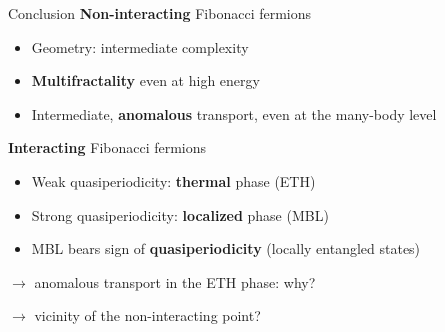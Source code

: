 \begin{frame}{Conclusion}
\textbf{Non-interacting} Fibonacci fermions
\begin{itemize}
	\item Geometry: intermediate complexity
	\item \textbf{Multifractality} even at high energy
	\item Intermediate, \textbf{anomalous} transport, even at the many-body level
\end{itemize}
\textbf{Interacting} Fibonacci fermions
\begin{itemize}
	\item Weak quasiperiodicity: \textcolor{comp}{\textbf{thermal} phase (ETH)}
	\item Strong quasiperiodicity: \textcolor{BostonBlue}{\textbf{localized} phase (MBL)}
	\item MBL bears sign of \textbf{quasiperiodicity} (locally entangled states)
\end{itemize}

$\to$ anomalous transport in the ETH phase: why?

$\to$ vicinity of the non-interacting point?

{}
\end{frame}

